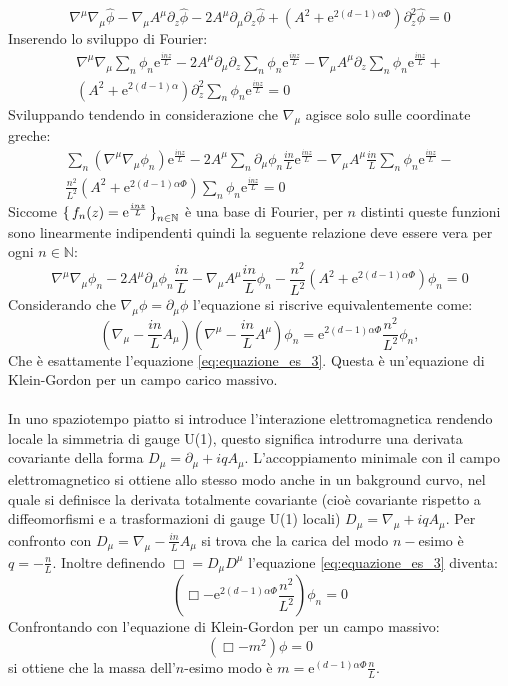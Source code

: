 \documentclass[]{scrartcl}
\newcommand{\me}{\mathrm{e}}
\newcommand{\pd}{\partial}
\newcommand{\sg}{\sqrt{-g}}
\begin{document}
\[
  \nabla^\mu\nabla_\mu \hat{\phi} - \nabla_\mu A^\mu \pd_z \hat{\phi} - 2 A^\mu \pd_\mu \pd_z \hat{\phi} + \left(A^2 + \me^{2(d-1)\alpha\Phi}\right)\pd_z^2 \hat{\phi} = 0
\]
Inserendo lo sviluppo di Fourier:
\begin{multline*}
  \nabla^\mu\nabla_\mu \sum_n \phi_n \me^{\frac{inz}{L}} - 2 A^\mu \pd_\mu \pd_z \sum_n \phi_n \me^{\frac{inz}{L}} -
  \nabla_\mu A^\mu \pd_z \sum_n \phi_n \me^{\frac{inz}{L}} + \\  (A^2 + \me^{2(d-1)\alpha}) \pd_z^2 \sum_n \phi_n \me^{\frac{inz}{L}} = 0
\end{multline*}
Sviluppando tendendo in considerazione che $ \nabla_\mu $ agisce solo sulle coordinate greche:
\begin{multline*}
  \sum_n \left( \nabla^\mu\nabla_\mu \phi_n  \right) \me^{\frac{inz}{L}} - 2 A^\mu \sum_n \pd_\mu \phi_n \frac{in}{L}  \me^{\frac{inz}{L}}
  - \nabla_\mu A^\mu \frac{in}{L}\sum_n \phi_n  \me^{\frac{inz}{L}} - \\ \frac{n^2}{L^2}(A^2 + \me^{2(d-1)\alpha\Phi})\sum_n \phi_n  \me^{\frac{inz}{L}} = 0
\end{multline*}
Siccome $ \set{ f_n(z) = \me^{\frac{inz}{L}}}_{n \in \mathbb{N}} $ è una base di Fourier, per $ n $ distinti queste funzioni sono linearmente indipendenti quindi la
seguente relazione deve essere vera per ogni $ n \in \mathbb{N} $:
\[
  \nabla^\mu\nabla_\mu \phi_n - 2 A^\mu \pd_\mu \phi_n \frac{in}{L}  - \nabla_\mu A^\mu \frac{in}{L} \phi_n - \frac{n^2}{L^2}(A^2 + \me^{2(d-1)\alpha\Phi}) \phi_n = 0
\]
Considerando che $ \nabla_\mu \phi = \pd_\mu \phi $ l'equazione si riscrive equivalentemente come:
\[
  \left( \nabla_\mu - \frac{in}{L} A_\mu \right) \left( \nabla^\mu - \frac{in}{L} A^\mu  \right) \phi_n = \me^{2 \left(d-1\right) \alpha \Phi}\frac{n^2}{L^2}\phi_n,
\]
Che è esattamente l'equazione \eqref{eq:equazione_es_3}. Questa è un'equazione di Klein-Gordon per un campo carico massivo.
\\ \\
In uno spaziotempo piatto si introduce l'interazione elettromagnetica rendendo locale la simmetria di gauge U(1), questo significa introdurre
una derivata covariante della forma $ D_\mu = \pd_\mu + iq A_\mu $. L'accoppiamento minimale con il campo elettromagnetico si ottiene allo stesso
modo anche in un bakground curvo, nel quale si definisce la derivata totalmente covariante (cioè covariante rispetto a diffeomorfismi e a trasformazioni
di gauge U(1) locali) $ D_\mu = \nabla_\mu + iq A_\mu $. Per confronto con $ D_\mu = \nabla_\mu - \frac{in}{L} A_\mu $ si trova che la carica del modo $ n- $esimo è
$ q = -\frac{n}{L} $.
Inoltre definendo $ \Box = D_\mu D^\mu $ l'equazione \eqref{eq:equazione_es_3} diventa:
\[
  \left( \Box - \me^{2 \left(d-1\right) \alpha \Phi}\frac{n^2}{L^2} \right) \phi_n = 0
\]
Confrontando con  l'equazione di Klein-Gordon per un campo massivo:
\[
  \left( \Box - m^2 \right) \phi = 0
\]
si ottiene che la massa dell'$ n $-esimo modo è $ m =  \me^{ \left(d-1\right) \alpha \Phi}\frac{n}{L} $.
\end{document}
